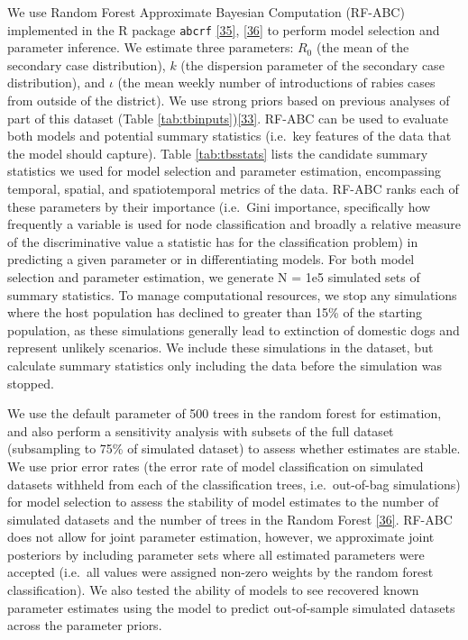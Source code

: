 \documentclass[
  oneside]{book}
\begin{document}
We use Random Forest Approximate Bayesian Computation (RF-ABC) implemented in the R package \texttt{abcrf} \protect\hyperlink{ref-pudlo2015}{{[}35{]}}, \protect\hyperlink{ref-raynal2018}{{[}36{]}} to perform model selection and parameter inference. We estimate three parameters: \(R_{0}\) (the mean of the secondary case distribution), \(k\) (the dispersion parameter of the secondary case distribution), and \(\iota\) (the mean weekly number of introductions of rabies cases from outside of the district). We use strong priors based on previous analyses of part of this dataset (Table \ref{tab:tbinputs})\protect\hyperlink{ref-Hampson2009}{{[}33{]}}. RF-ABC can be used to evaluate both models and potential summary statistics (i.e.~key features of the data that the model should capture). Table \ref{tab:tbsstats} lists the candidate summary statistics we used for model selection and parameter estimation, encompassing temporal, spatial, and spatiotemporal metrics of the data. RF-ABC ranks each of these parameters by their importance (i.e.~Gini importance, specifically how frequently a variable is used for node classification and broadly a relative measure of the discriminative value a statistic has for the classification problem) in predicting a given parameter or in differentiating models. For both model selection and parameter estimation, we generate N = 1e5 simulated sets of summary statistics. To manage computational resources, we stop any simulations where the host population has declined to greater than 15\% of the starting population, as these simulations generally lead to extinction of domestic dogs and represent unlikely scenarios. We include these simulations in the dataset, but calculate summary statistics only including the data before the simulation was stopped.

We use the default parameter of 500 trees in the random forest for estimation, and also perform a sensitivity analysis with subsets of the full dataset (subsampling to 75\% of simulated dataset) to assess whether estimates are stable. We use prior error rates (the error rate of model classification on simulated datasets withheld from each of the classification trees, i.e.~out-of-bag simulations) for model selection to assess the stability of model estimates to the number of simulated datasets and the number of trees in the Random Forest \protect\hyperlink{ref-raynal2018}{{[}36{]}}. RF-ABC does not allow for joint parameter estimation, however, we approximate joint posteriors by including parameter sets where all estimated parameters were accepted (i.e.~all values were assigned non-zero weights by the random forest classification). We also tested the ability of models to see recovered known parameter estimates using the model to predict out-of-sample simulated datasets across the parameter priors.
\end{document}
